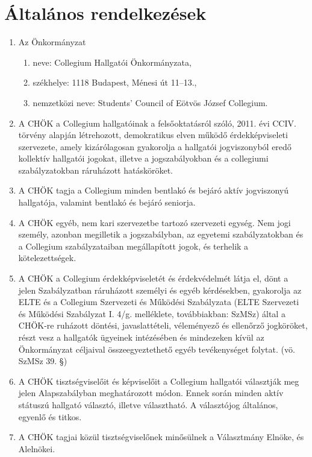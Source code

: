 \documentclass{../styles/rulebook}
\begin{document}
\section{Általános rendelkezések}
\begin{enumerate}
	\item Az Önkormányzat 
	\begin{enumerate}
		\item neve: Collegium Hallgatói Önkormányzata, 
		\item székhelye: 1118 Budapest, Ménesi út 11--13.,
		\item nemzetközi neve: Students’ Council of Eötvös József Collegium.
	\end{enumerate}
	\item A CHÖK a Collegium hallgatóinak a felsőoktatásról szóló, 2011. évi CCIV. törvény alapján létrehozott, demokratikus elven működő érdekképviseleti szervezete, amely kizárólagosan gyakorolja a hallgatói jogviszonyból eredő kollektív hallgatói jogokat, illetve a jogszabályokban és a collegiumi szabályzatokban ráruházott hatásköröket. 
	\item A CHÖK tagja a Collegium minden bentlakó és bejáró aktív jogviszonyú hallgatója, valamint bentlakó és bejáró seniorja.
	\item A CHÖK egyéb, nem kari szervezetbe tartozó szervezeti egység. Nem jogi személy, azonban megilletik a jogszabályban, az egyetemi szabályzatokban és a Collegium szabályzataiban megállapított jogok, és terhelik a kötelezettségek.
	\item A CHÖK a Collegium érdekképviseletét és érdekvédelmét látja el, dönt a jelen Szabályzatban ráruházott személyi és egyéb kérdésekben, gyakorolja az ELTE és a Collegium Szervezeti és Működési Szabályzata (ELTE Szervezeti és Működési Szabályzat I. 4/g. melléklete, továbbiakban: SzMSz) által a CHÖK-re ruházott döntési, javaslattételi, véleményező és ellenőrző jogköröket, részt vesz a hallgatók ügyeinek intézésében és mindezeken kívül az Önkormányzat céljaival összeegyeztethető egyéb tevékenységet folytat. (vö. SzMSz 39. §)
	\item A CHÖK tisztségviselőit és képviselőit a Collegium hallgatói választják meg jelen Alapszabályban meghatározott módon. Ennek során minden aktív státuszú hallgató választó, illetve választható. A választójog általános, egyenlő és titkos.
	\item A CHÖK tagjai közül tisztségviselőnek minősülnek a Választmány Elnöke, és Alelnökei.
	
\end{enumerate}
\end{document}
